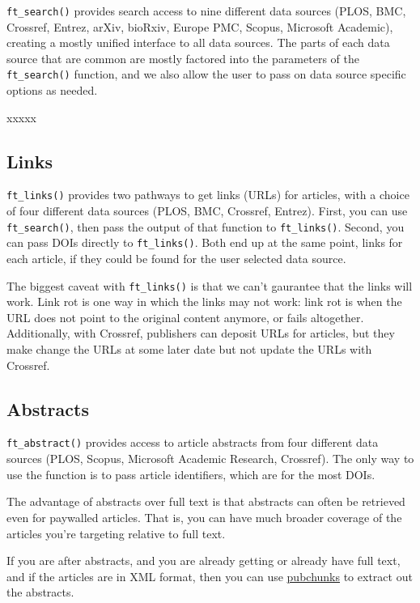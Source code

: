 \documentclass[author-year, review, 11pt]{components/elsarticle} %
\begin{document}
\texttt{ft\_search()} provides search access to nine different data
sources (PLOS, BMC, Crossref, Entrez, arXiv, bioRxiv, Europe PMC,
Scopus, Microsoft Academic), creating a mostly unified interface to all
data sources. The parts of each data source that are common are mostly
factored into the parameters of the \texttt{ft\_search()} function, and
we also allow the user to pass on data source specific options as
needed.

xxxxx

\hypertarget{links}{%
\subsection{Links}\label{links}}

\texttt{ft\_links()} provides two pathways to get links (URLs) for
articles, with a choice of four different data sources (PLOS, BMC,
Crossref, Entrez). First, you can use \texttt{ft\_search()}, then pass
the output of that function to \texttt{ft\_links()}. Second, you can
pass DOIs directly to \texttt{ft\_links()}. Both end up at the same
point, links for each article, if they could be found for the user
selected data source.

The biggest caveat with \texttt{ft\_links()} is that we can't gaurantee
that the links will work. Link rot is one way in which the links may not
work: link rot is when the URL does not point to the original content
anymore, or fails altogether. Additionally, with Crossref, publishers
can deposit URLs for articles, but they make change the URLs at some
later date but not update the URLs with Crossref.

\hypertarget{abstracts}{%
\subsection{Abstracts}\label{abstracts}}

\texttt{ft\_abstract()} provides access to article abstracts from four
different data sources (PLOS, Scopus, Microsoft Academic Research,
Crossref). The only way to use the function is to pass article
identifiers, which are for the most DOIs.

The advantage of abstracts over full text is that abstracts can often be
retrieved even for paywalled articles. That is, you can have much
broader coverage of the articles you're targeting relative to full text.

If you are after abstracts, and you are already getting or already have
full text, and if the articles are in XML format, then you can use
\href{https://github.com/ropensci/pubchunks}{pubchunks} to extract out
the abstracts.
\end{document}
